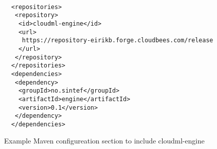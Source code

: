 \begin{figure}
  \begin{center}
    \begin{verbatim}

  <repositories>
   <repository>
    <id>cloudml-engine</id>
    <url>
     https://repository-eirikb.forge.cloudbees.com/release
    </url>
   </repository>
  </repositories>
  <dependencies>
   <dependency>
    <groupId>no.sintef</groupId>
    <artifactId>engine</artifactId>
    <version>0.1</version>
   </dependency>
  </dependencies>
    \end{verbatim}
  \end{center}
  \caption{Example Maven configureation section to include cloudml-engine}
  \label{fig:pom-example}
\end{figure}

